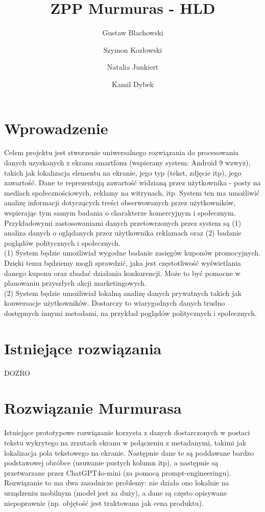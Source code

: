 \documentclass[12pt]{article}
\title{ZPP Murmuras - HLD}
\author{Gustaw Blachowski \and Szymon Kozłowski \and Natalia Junkiert \and Kamil Dybek}
\date{}
\begin{document}
\maketitle

\section*{Wprowadzenie}

Celem projektu jest stworzenie uniwersalnego rozwiązania do procesowania danych uzyskanych z ekranu smartfonu (wspierany system: Android 9 wzwyż), takich jak lokalizacja elementu na ekranie, jego typ (tekst, zdjęcie itp), jego zawartość. Dane te reprezentują zawartość widzianą przez użytkownika - posty na mediach społecznościowych, reklamy na witrynach, itp. System ten ma umożliwić analizę informacji dotyczących treści obserwowanych przez użytkowników, wspierając tym samym badania o charakterze komercyjnym i społecznym. \\

Przykładowymi zastosowaniami danych przetowrzonych przez system są (1) analiza danych o oglądanych przez użytkownika reklamach oraz (2) badanie poglądów politycznych i społecznych. \\

(1) System będzie umożliwiał wygodne badanie zasięgów kuponów promocyjnych. Dzięki temu będziemy mogli sprawdzić, jaka jest częstotliwość wyświetlania danego kuponu oraz zbadać działania konkurencji. Może to być pomocne w planowaniu przyszłych akcji marketingowych. \\

(2) System będzie umożliwiał lokalną analizę danych prywatnych takich jak konwersacje użytkowników. Dostarczy to wiarygodnych danych trudno dostępnych innymi metodami, na przykład poglądów politycznych i społecznych.


\section*{Istniejące rozwiązania}
DOZRO

\section*{Rozwiązanie Murmurasa}
Istniejące prototypowe rozwiązanie korzysta z danych dostarczonych w postaci tekstu wykrytego na zrzutach ekranu w połączeniu z metadanymi, takimi jak lokalizacja pola tekstowego na ekranie. Następnie dane te są poddawane bardzo podstawowej obróbce (usuwanie pustych kolumn itp), a następnie są przetwarzane przez ChatGPT4o-mini (za pomocą prompt-engineeringu). Rozwiązanie to ma dwa zasadnicze problemy: nie działa ono lokalnie na urządzeniu mobilnym (model jest za duży), a dane są często opisywane niepoprawnie (np. objętość jest traktowana jak cena produktu).
\end{document}
